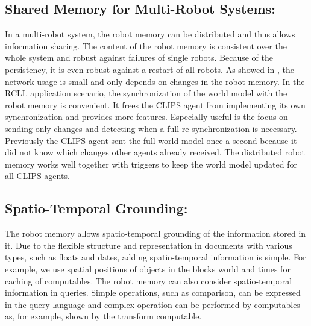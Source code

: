 \subsection{Shared Memory for Multi-Robot Systems:} 
In a multi-robot system, the robot memory can be distributed and thus
allows information sharing. The content of the robot memory is
consistent over the whole system and robust against failures of single
robots. Because of the persistency, it is even robust against a restart
of all robots. As showed in , the network
usage is small and only depends on changes in the robot memory. In the
RCLL application scenario, the synchronization of the world model with
the robot memory is convenient. It frees the CLIPS agent from
implementing its own synchronization and provides more
features. Especially useful is the focus on sending only changes and
detecting when a full re-synchronization is necessary. Previously the
CLIPS agent sent the full world model once a second because it did not
know which changes other agents already received. The distributed
robot memory works well together with triggers to keep the world model
updated for all CLIPS agents.

\subsection{Spatio-Temporal Grounding:}
The robot memory allows spatio-temporal grounding of the information
stored in it. Due to the flexible structure and representation in documents
with various types, such as floats and dates, adding spatio-temporal
information is simple. For example, we use spatial positions
of objects in the blocks world and times for caching of computables.
The robot memory can also consider spatio-temporal information in
queries. Simple operations, such as comparison, can be expressed in
the query language and complex operation can be performed by
computables as, for example, shown by the transform computable.

